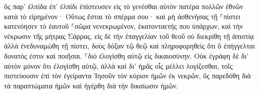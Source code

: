 \documentclass{openreader}
\begin{document}
ὃς παρ’ ἐλπίδα ἐπ’ ἐλπίδι ἐπίστευσεν εἰς τὸ γενέσθαι αὐτὸν πατέρα πολλῶν ἐθνῶν κατὰ τὸ εἰρημένον· Οὕτως ἔσται τὸ σπέρμα σου· 
καὶ μὴ ἀσθενήσας τῇ ⸀πίστει κατενόησεν τὸ ἑαυτοῦ ⸀σῶμα νενεκρωμένον, ἑκατονταετής που ὑπάρχων, καὶ τὴν νέκρωσιν τῆς μήτρας Σάρρας, 
εἰς δὲ τὴν ἐπαγγελίαν τοῦ θεοῦ οὐ διεκρίθη τῇ ἀπιστίᾳ ἀλλὰ ἐνεδυναμώθη τῇ πίστει, δοὺς δόξαν τῷ θεῷ 
καὶ πληροφορηθεὶς ὅτι ὃ ἐπήγγελται δυνατός ἐστιν καὶ ποιῆσαι. 
⸀διὸ ἐλογίσθη αὐτῷ εἰς δικαιοσύνην. 
Οὐκ ἐγράφη δὲ δι’ αὐτὸν μόνον ὅτι ἐλογίσθη αὐτῷ, 
ἀλλὰ καὶ δι’ ἡμᾶς οἷς μέλλει λογίζεσθαι, τοῖς πιστεύουσιν ἐπὶ τὸν ἐγείραντα Ἰησοῦν τὸν κύριον ἡμῶν ἐκ νεκρῶν, 
ὃς παρεδόθη διὰ τὰ παραπτώματα ἡμῶν καὶ ἠγέρθη διὰ τὴν δικαίωσιν ἡμῶν. 
\end{document}
